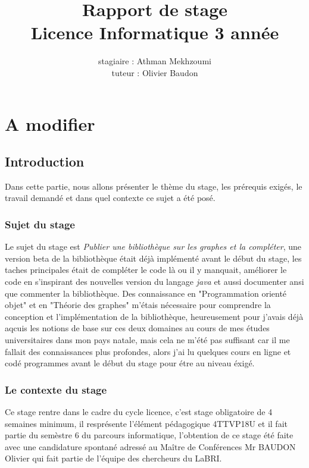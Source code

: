 \documentclass[12pt]{report}
\title{Rapport de stage \\
Licence Informatique 3\up{ème} année}
\author{stagiaire : Athman Mekhzoumi\\
tuteur : Olivier Baudon}
\begin{document}
\newpage
\maketitle
\tableofcontents
\newpage

\chapter{A modifier}

\section{Introduction}

Dans cette partie, nous allons présenter le thème du stage, les prérequis exigés, le travail demandé et dans quel contexte ce sujet a été posé.

\subsection{Sujet du stage}

Le sujet du stage est \textit{Publier une bibliothèque sur les graphes et la compléter}, une version beta de la bibliothèque était déjà implémenté avant le début du stage, les taches principales était de compléter le code là ou il y manquait, améliorer le code en s'inspirant des nouvelles version du langage \textit{java} et aussi documenter ansi que commenter la bibliothèque.
\newline Des connaissance en "Programmation orienté objet" et en "Théorie des graphes" m'étais nécessaire pour comprendre la conception et l'implémentation de la bibliothèque, heureusement pour j'avais déjà aqcuis les notions de base sur ces deux domaines au cours de mes études universitaires dans mon pays natale, mais cela ne m'été pas suffisant car il me fallait des connaissances plus profondes, alors j'ai lu quelques cours en ligne et codé programmes avant le début du stage pour étre au niveau éxigé. 

\subsection{Le contexte du stage}

Ce stage rentre dans le cadre du cycle licence, c'est stage obligatoire de 4 semaines minimum, il resprésente l'élément pédagogique 4TTVP18U et il fait partie du semèstre 6 du parcours informatique, l'obtention de ce stage été faite avec une candidature spontané adressé au Maître de Conférences Mr BAUDON Olivier qui fait partie de l'équipe des chercheurs du LaBRI.
\end{document}
